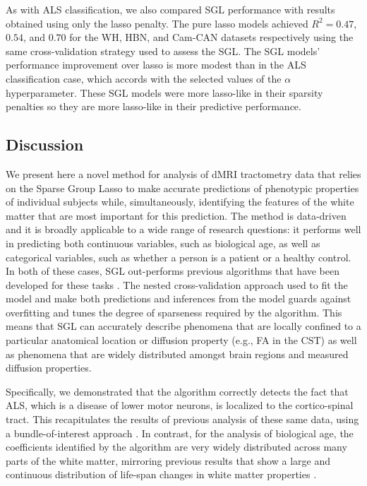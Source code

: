 \documentclass[10pt,%
               aps,%
               prl,%
               reprint,%
               superscriptaddress,%
               preprintnumbers,%
               linenumbers,%
               amsmath,%
               floatfix]{revtex4-1}
\begin{document}
As with ALS classification, we also compared SGL performance with results
obtained using only the lasso penalty. The pure lasso models achieved $R^2 =
0.47$, $0.54$, and $0.70$ for the WH, HBN, and Cam-CAN datasets respectively
using the same cross-validation strategy used to assess the SGL. The SGL
models' performance improvement over lasso is more modest than in the ALS
classification case, which accords with the selected values of the $\alpha$
hyperparameter. These SGL models were more lasso-like in their sparsity
penalties so they are more lasso-like in their predictive performance.

\subsection*{Discussion}

We present here a novel method for analysis of dMRI tractometry data that
relies on the Sparse Group Lasso \cite{simon2013sparse} to make accurate
predictions of phenotypic properties of individual subjects while,
simultaneously, identifying the features of the white matter that are
most important for this prediction. The method is data-driven and it is broadly applicable to a wide range of research questions: it
performs well in predicting both continuous variables, such as biological
age, as well as categorical variables, such as whether a person is a patient
or a healthy control. In both of these cases, SGL out-performs previous
algorithms that have been developed for these tasks
\cite{sarica2017corticospinal, Richard2018-ux, mcpherson2020single}. The
nested cross-validation approach used to fit the model and make both
predictions and inferences from the model guards against overfitting and
tunes the degree of sparseness required by the algorithm. This means that SGL
can accurately describe phenomena that are locally confined to a particular
anatomical location or diffusion property (e.g., FA in the CST) as well as
phenomena that are widely distributed amongst brain regions and measured
diffusion properties.

Specifically, we demonstrated that the algorithm correctly detects the fact
that ALS, which is a disease of lower motor neurons, is localized to the
cortico-spinal tract. This recapitulates the results of previous analysis of
these same data, using a bundle-of-interest approach
\cite{sarica2017corticospinal}. In contrast, for the analysis of biological
age, the coefficients identified by the algorithm are very widely distributed
across many parts of the white matter, mirroring previous results that show a
large and continuous distribution of life-span changes in white matter
properties \cite{yeatman2014lifespan}.
\end{document}
